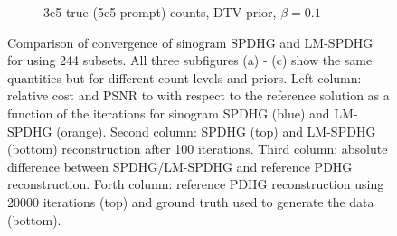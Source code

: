 \begin{figure}
\begin{subfigure}[]{1.0\textwidth}
    \caption{3e5 true (5e5 prompt) counts, DTV prior, $\beta = 0.1$}
  \end{subfigure}
  \caption{Comparison of convergence of sinogram SPDHG and LM-SPDHG
           for using 244 subsets.
           All three subfigures (a) - (c) show the same quantities but for
           different count levels and priors.
           Left column: relative cost and PSNR to with respect to the reference solution as
           a function of the iterations for sinogram SPDHG (blue) and LM-SPDHG (orange).
           Second column: SPDHG (top) and LM-SPDHG (bottom) reconstruction after 100 iterations.
           Third column: absolute difference between SPDHG/LM-SPDHG and reference PDHG reconstruction.
           Forth column: reference PDHG reconstruction using 20000 iterations (top) and ground truth
           used to generate the data (bottom).}
  \label{fig:lm-spdhg-var}
\end{figure}

